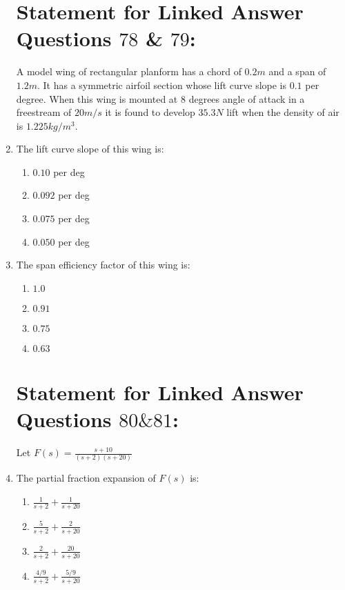 \documentclass[journal]{IEEEtran}
\begin{document}
\begin{enumerate}
\section*{Statement for Linked Answer Questions $78$ \& $79$:}
A model wing of rectangular planform has a chord of $0.2 m$ and a span of $1.2 m$. It has a symmetric airfoil section whose lift curve slope is $0.1$ per degree. When this wing is mounted at $8$ degrees angle of attack in a freestream of $20 m/s$ it is found to develop $35.3 N$ lift when the density of air is $1.225 kg/m^3$.\\

\item The lift curve slope of this wing is:
\begin{enumerate}
    \item  $0.10$ per deg
    \item  $0.092$ per deg
    \item  $0.075$ per deg
    \item  $0.050$ per deg\\
\end{enumerate}

\item The span efficiency factor of this wing is:
\begin{enumerate}
    \item  $1.0$
    \item  $0.91$
    \item  $0.75$
    \item  $0.63$\\
\end{enumerate}

\section*{Statement for Linked Answer Questions $80 \& 81$:}
Let $F(s) = \frac{s+10}{(s+2)(s+20)}$\\

\item The partial fraction expansion of $F(s)$ is:
\begin{enumerate}
    \item  $\frac{1}{s+2} + \frac{1}{s+20}$
    \item  $\frac{5}{s+2} + \frac{2}{s+20}$
    \item  $\frac{2}{s+2} + \frac{20}{s+20}$
    \item  $\frac{4/9}{s+2} + \frac{5/9}{s+20}$\\
\end{enumerate}


\end{enumerate}
\end{document}
